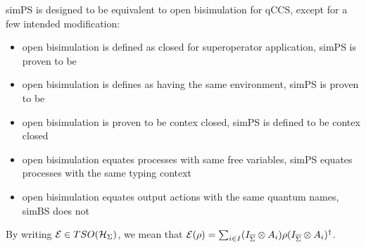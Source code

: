 simPS is designed to be equivalent to open bisimulation for qCCS, except for a few intended modification:\begin{itemize}
\item open bisimulation is defined as closed for superoperator application, simPS is proven to be
\item open bisimulation is defines as having the same environment, simPS is proven to be
\item open bisimulation is proven to be contex closed, simPS is defined to be contex closed
\item open bisimulation equates processes with same free variables, simPS equates processes with the same typing context
\item open bisimulation equates output actions with the same quantum names, simBS does not
\end{itemize}


By writing $\mathcal{E} \in TSO(\mathcal{H}_{\Sigma})$, we mean that $\mathcal{E}(\rho) = \sum_{i \in I} (I_{\overline{\Sigma}} \otimes A_i) \rho (I_{\overline{\Sigma}} \otimes A_i)^{\dagger}$.

